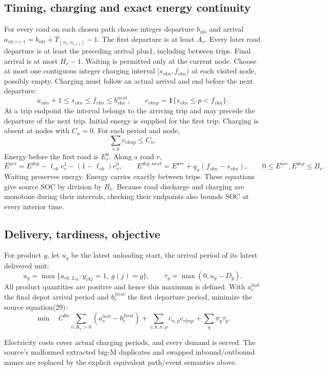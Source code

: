 \documentclass{article}
\begin{document}
\subsection*{Timing, charging and exact energy continuity}
For every road on each chosen path choose integer departure $b_{vki}$ and arrival
$a_{vk,i+1}=b_{vki}+T_{(n_i,n_{i+1})}-1$.
The first departure is at least $A_v$. Every later road departure is at least
the preceding arrival plus1, including between trips. Final arrival is at most
$H_v-1$. Waiting is permitted only at the current node.
Choose at most one contiguous integer charging interval
$[s_{vkn},f_{vkn})$ at each visited node, possibly empty.
Charging must follow an actual arrival and end before the next departure:
\[
 a_{vkn}+1\le s_{vkn}\le f_{vkn}\le b^{next}_{vkn},\qquad
 c_{vknp}=\mathbf1\{s_{vkn}\le p<f_{vkn}\}.
\]
At a trip endpoint the interval belongs to the arriving trip and may precede
the departure of the next trip. Initial energy is supplied for the first trip. Charging is absent at nodes with $C_n=0$.
For each period and node,
\[
 \sum_{v,k}c_{vknp}\le C_n .
\]
Energy before the first road is $E_v^0$. Along a road $r$,
\[
 E^{arr}=E^{dep}-\ell_{vk}e_r^1-(1-\ell_{vk})e_r^0,\qquad
 E^{dep,next}=E^{arr}+q_n(f_{vkn}-s_{vkn}),\qquad
 0\le E^{arr},E^{dep}\le B_v .
\]
Waiting preserves energy. Energy carries exactly between trips. These equations give source SOC by division by $B_v$.
Because road discharge and charging are monotone during their intervals,
checking their endpoints also bounds SOC at every interior time.

\subsection*{Delivery, tardiness, objective}
For product $g$, let $u_g$ be the latest unloading start, the arrival period
of its latest delivered unit:
\[
 u_g=\max\{a_{vk,L_{vk}}:y_{vkj}=1,\ g(j)=g\},\qquad
 \tau_g=\max(0,u_g-D_g).
\]
All product quantities are positive and hence this maximum is defined.
With $a_v^{last}$ the final depot arrival period and $b_v^{first}$ the first
departure period, minimize the source equation(29):
\[
 \min\quad
 C^{lbr}\sum_{v:K_v>0}(a_v^{last}-b_v^{first})
 +\sum_{v,k,n,p}c_{n,p}c_{vknp}
 +\sum_g\pi_g\tau_g .
\]

Electricity costs cover actual charging periods, and every demand is served.
The source's malformed extracted big-M duplicates and swapped inbound/outbound
names are replaced by the explicit equivalent path/event semantics above.
\end{document}
